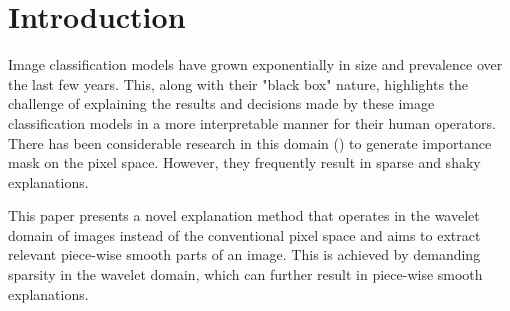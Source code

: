 \newcommand{\norm}[1]{\left\Vert #1 \right\Vert}
\newcommand{\Z}{\mathbb{Z}}
\newcommand{\Q}{\mathbb{Q}}
\newcommand{\N}{\mathbb{N}}
\newcommand{\R}{\mathbb{R}}


\renewcommand{\P}{\mathbb{P}}
\newcommand{\Id}{\operatorname{Id}}

\newcommand{\calS}{\mathcal{S}}
\newcommand{\calP}{\mathcal{P}}
\newcommand{\calF}{\mathcal{F}}
\newcommand{\calL}{\mathcal{L}}
\newcommand{\calV}{\mathcal{V}}


\newcommand{\abs}[1]{\left\vert #1 \right\vert}
\newcommand{\set}[1]{\left\lbrace #1\right\rbrace}
\newcommand{\sse}{\subseteq}
\newcommand{\sprod}[1]{\left\langle #1 \right\rangle}
\section{Introduction}
Image classification models have grown exponentially in size and prevalence over the last few years. This, along with their "black box" nature, highlights the challenge of explaining the results and decisions made by these image classification models in a more interpretable manner for their human operators. There has been considerable research in this domain (\cite{macdonald2019rate, selvaraju2017grad, sundararajan2017axiomatic, smilkov2017smoothgrad, springenberg2014striving, LRP, ribeiro2016should}) to generate importance mask on the pixel space. However, they frequently result in sparse and shaky explanations.

This paper presents a novel explanation method that operates in the wavelet domain of images instead of the conventional pixel space and aims to extract relevant piece-wise smooth parts of an image. This is achieved by demanding sparsity in the wavelet domain, which can further result in piece-wise smooth explanations.


